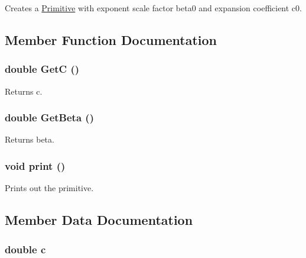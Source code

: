 Creates a \hyperlink{classJKBuilder_1_1Primitive}{Primitive} with exponent scale factor beta0 and expansion coefficient c0. 

\subsection{Member Function Documentation}
\hypertarget{classJKBuilder_1_1Primitive_a229a18fdc499aafe149c55011f9fb2fb}{
\subsubsection[{GetC}]{\setlength{\rightskip}{0pt plus 5cm}double GetC ()}}
\label{classJKBuilder_1_1Primitive_a229a18fdc499aafe149c55011f9fb2fb}


Returns c. \hypertarget{classJKBuilder_1_1Primitive_a8b788f95c3fa1f2cc9aedaa1b92b78a1}{
\subsubsection[{GetBeta}]{\setlength{\rightskip}{0pt plus 5cm}double GetBeta ()}}
\label{classJKBuilder_1_1Primitive_a8b788f95c3fa1f2cc9aedaa1b92b78a1}


Returns beta. \hypertarget{classJKBuilder_1_1Primitive_a388f572c62279f839ee138a9afbdeeb5}{
\subsubsection[{print}]{\setlength{\rightskip}{0pt plus 5cm}void print ()}}
\label{classJKBuilder_1_1Primitive_a388f572c62279f839ee138a9afbdeeb5}


Prints out the primitive. 

\subsection{Member Data Documentation}
\hypertarget{classJKBuilder_1_1Primitive_a2c09e929a6ea340fc9653cca414b11d3}{
\subsubsection[{c}]{\setlength{\rightskip}{0pt plus 5cm}double {\bf c}}}
\label{classJKBuilder_1_1Primitive_a2c09e929a6ea340fc9653cca414b11d3}


